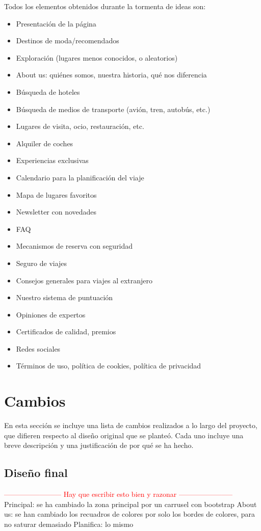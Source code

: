 \documentclass[11pt, a4paper]{book}
\begin{document}
	Todos los elementos obtenidos durante la tormenta de ideas son:
	
	\begin{itemize}
		\item Presentación de la página
		\item Destinos de moda/recomendados
		\item Exploración (lugares menos conocidos, o aleatorios)
		\item About us: quiénes somos, nuestra historia, qué nos diferencia
		\item Búsqueda de hoteles
		\item Búsqueda de medios de transporte (avión, tren, autobús, etc.)
		\item Lugares de visita, ocio, restauración, etc.
		\item Alquiler de coches
		\item Experiencias exclusivas
		\item Calendario para la planificación del viaje
		\item Mapa de lugares favoritos
		\item Newsletter con novedades
		\item FAQ
		\item Mecanismos de reserva con seguridad
		\item Seguro de viajes
		\item Consejos generales para viajes al extranjero
		\item Nuestro sistema de puntuación
		\item Opiniones de expertos
		\item Certificados de calidad, premios
		\item Redes sociales
		\item Términos de uso, política de cookies, política de privacidad
	\end{itemize}


	\section{Cambios}
	\label{sect:anexo2}
	En esta sección se incluye una lista de cambios realizados a lo largo del proyecto, que difieren respecto al diseño original que se planteó. Cada uno incluye una breve descripción y una justificación de por qué se ha hecho.
	
	\subsection{Diseño final}
	\textcolor{red}{------------------------ Hay que escribir esto bien y razonar -----------------------}
	Principal: se ha cambiado la zona principal por un carrusel con bootstrap
	About us: se han cambiado los recuadros de colores por solo los bordes de colores, para no saturar demasiado
	Planifica: lo mismo
	
\end{document}
